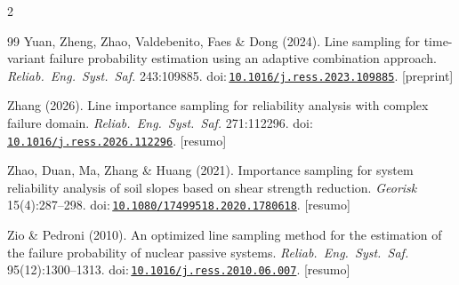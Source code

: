 \documentclass[11pt,a4paper]{article}
\newcommand{\doi}[1]{doi:\,\href{https://doi.org/#1}{\nolinkurl{#1}}}
\begin{document}
\begin{multicols}{2}
\begin{thebibliography}{99}
 Yuan, Zheng, Zhao, Valdebenito, Faes \& Dong (2024). Line sampling for
time-variant failure probability estimation using an adaptive combination approach. \emph{Reliab.\ Eng.\ Syst.\ Saf.}
243:109885. \doi{10.1016/j.ress.2023.109885}. [preprint]

 Zhang (2026). Line importance sampling for reliability analysis with complex failure
domain. \emph{Reliab.\ Eng.\ Syst.\ Saf.} 271:112296. \doi{10.1016/j.ress.2026.112296}. [resumo]

 Zhao, Duan, Ma, Zhang \& Huang (2021). Importance sampling for system reliability
analysis of soil slopes based on shear strength reduction. \emph{Georisk} 15(4):287--298.
\doi{10.1080/17499518.2020.1780618}. [resumo]

 Zio \& Pedroni (2010). An optimized line sampling method for the estimation of
the failure probability of nuclear passive systems. \emph{Reliab.\ Eng.\ Syst.\ Saf.} 95(12):1300--1313.
\doi{10.1016/j.ress.2010.06.007}. [resumo]

\end{thebibliography}
\end{multicols}
\end{document}
